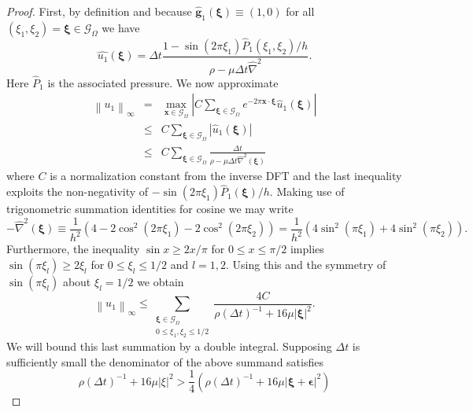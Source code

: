 \documentclass[preprint,12pt]{elsarticle}
\newcommand{\norm}[1]{\left\lVert#1\right\rVert}
\begin{document}
\begin{proof}
First, by definition and because $\hat{\mathbf{g}}_1(\mathbf{\xi}) \equiv (1,0)$ for all $(\xi_1,\xi_2) = \mathbf{\xi} \in \mathcal{G}_\Omega$ we have
\begin{equation}
\hat{u_1}(\mathbf{\xi})
= 
\Delta t\frac{1 - \sin(2\pi\xi_1)\hat{P}_1(\xi_1,\xi_2)/h}
{\rho-\mu\Delta t \widehat{\nabla}^2}.
\end{equation}
Here $\hat{P}_1$ is the associated pressure. We now approximate
\begin{eqnarray}
\norm{u_1}_\infty &=&
\max_{\mathbf{x}\in\mathcal{G}_\Omega} \left|
C\sum_{\mathbf{\xi}\in\mathcal{G}_\Omega}
e^{-2\pi\mathbf{x}\cdot\mathbf{\xi}} \hat{u}_1(\mathbf{\xi})
\right| \\
&\leq&
C\sum_{\mathbf{\xi}\in\mathcal{G}_\Omega}
\left| \hat{u}_1(\mathbf{\xi}) \right| \\
&\leq&
C\sum_{\mathbf{\xi}\in\mathcal{G}_\Omega}
\frac{\Delta t}
{\rho-\mu\Delta t \widehat{\nabla}^2(\mathbf{\xi})}
\end{eqnarray}
where $C$ is a normalization constant from the inverse DFT and the last inequality exploits the non-negativity of
$-\sin(2\pi\xi_1)\hat{P}_1(\mathbf{\xi})/h$.
Making use of trigonometric summation identities for cosine we may write 
\begin{equation}
-\widehat{\nabla}^2(\mathbf{\xi}) 
\equiv
\frac{1}{h^2}\left(
4 - 2\cos^2(2\pi\xi_1) - 2\cos^2(2\pi\xi_2)
\right)
=
\frac{1}{h^2}\left(
4\sin^2(\pi\xi_1) + 4\sin^2(\pi\xi_2)
\right).
\end{equation}
Furthermore, the inequality $\sin x \geq 2x/\pi$ for $0 \leq x \leq \pi/2$ implies $\sin(\pi\xi_l) \geq 2\xi_l$ for $0 \leq \xi_l \leq 1/2$ and $l=1,2$. Using this and the symmetry of $\sin(\pi\xi_l)$ about $\xi_l=1/2$ we obtain
\begin{equation}
\norm{u_1}_\infty \leq
\sum_{\begin{array}{c}
\mathbf{\xi} \in \mathcal{G}_\Omega \\
0 \leq \xi_1,\xi_2 \leq 1/2 \end{array}}
\frac{4C}
{\rho(\Delta t)^{-1}+16\mu|\mathbf{\xi}|^2}.
\end{equation}
We will bound this last summation by a double integral.
Supposing $\Delta t$ is sufficiently small the denominator of the above summand satisfies
\begin{equation}
\rho(\Delta t)^{-1}+16\mu|\xi|^2 >
\frac{1}{4}\left(\rho(\Delta t)^{-1}+16\mu|\mathbf{\xi}+\mathbf{\epsilon}|^2\right)
\end{equation}

\end{proof}
\end{document}
